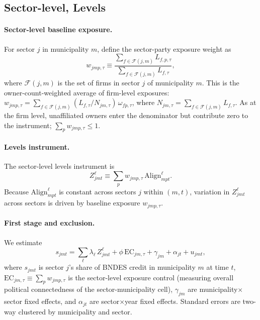 \documentclass{article}
\newcommand{\Align}{\mathrm{Align}}
\newcommand{\EC}{\mathrm{EC}}
\begin{document}
\subsection{Sector-level, Levels}

\paragraph{Sector-level baseline exposure.}
For sector $j$ in municipality $m$, define the sector-party exposure weight as
\[
  w_{jmp,\tau} \equiv
  \frac{\sum_{f\in\mathcal{F}(j,m)} L_{f,p,\tau}}
       {\sum_{f\in\mathcal{F}(j,m)} L_{f,\tau}},
\]
where $\mathcal{F}(j,m)$ is the set of firms in sector $j$ of municipality $m$.
This is the owner-count-weighted average of firm-level exposures:
$w_{jmp,\tau} = \sum_{f\in\mathcal{F}(j,m)} (L_{f,\tau}/N_{jm,\tau})\,\omega_{fp,\tau}$,
where $N_{jm,\tau} = \sum_{f\in\mathcal{F}(j,m)} L_{f,\tau}$.
As at the firm level, unaffiliated owners enter the denominator but contribute zero
to the instrument; $\sum_p w_{jmp,\tau} \leq 1$.

\paragraph{Levels instrument.}
The sector-level levels instrument is
\[
  Z^{\ell}_{jmt} \equiv \sum_{p} w_{jmp,\tau}\,\Align^{\ell}_{mpt}.
\]
Because $\Align^{\ell}_{mpt}$ is constant across sectors $j$ within $(m,t)$,
variation in $Z^{\ell}_{jmt}$ across sectors is driven by baseline exposure $w_{jmp,\tau}$.

\paragraph{First stage and exclusion.}
We estimate
\[
  s_{jmt} = \sum_{\ell} \lambda_{\ell}\, Z^{\ell}_{jmt}
  + \phi\,\EC_{jm,\tau} + \gamma_{jm} + \alpha_{jt} + u_{jmt},
\]
where $s_{jmt}$ is sector $j$'s share of BNDES credit in municipality $m$ at time $t$,
$\EC_{jm,\tau} \equiv \sum_p w_{jmp,\tau}$ is the sector-level exposure control
(measuring overall political connectedness of the sector-municipality cell),
$\gamma_{jm}$ are municipality$\times$sector fixed effects,
and $\alpha_{jt}$ are sector$\times$year fixed effects.
Standard errors are two-way clustered by municipality and sector.
\end{document}
